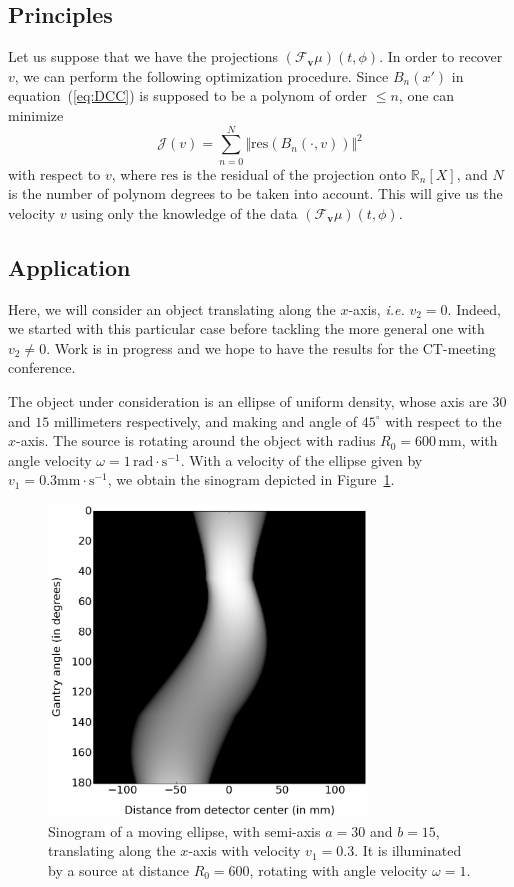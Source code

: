 \documentclass[9pt,technote]{IEEEtran}
\numberwithin{equation}{section}
\newcommand{\R}{\mathbb{R}}
\newcommand{\ie}{\emph{i.e.} }
\newcommand{\Tbv}{\mathcal{F}_{\mathbf{v}}}
\begin{document}
\subsection{Principles}
\label{sub:principles}
Let us suppose that we have the projections $\left( \Tbv \mu \right)(t,\phi)$. In order to recover $v$, we can perform the following optimization procedure. Since $B_n(x')$ in equation~(\ref{eq:DCC}) is supposed to be a polynom of order $\leq n$, one can minimize
\begin{equation}
	\mathcal{J}(v) = \sum_{n=0}^N \Vert \textrm{res} \left( B_n(\cdot,v) \right) \Vert^2
\end{equation}
with respect to $v$, where $\textrm{res}$ is the residual of the projection onto $\R_n[X]$, and $N$ is the number of polynom degrees to be taken into account. This will give us the velocity $v$ using only the knowledge of the data $\left( \Tbv \mu \right)(t,\phi)$.

\subsection{Application}
\label{sub:application}
Here, we will consider an object translating along the $x$-axis, \ie $v_2=0$. Indeed, we started with this particular case before tackling the more general one with $v_2 \neq 0$. Work is in progress and we hope to have the results for the CT-meeting conference. 

The object under consideration is an ellipse of uniform density, whose axis are $30$ and $15$ millimeters respectively, and making and angle of $45^{\circ}$ with respect to the $x$-axis. The source is rotating around the object with radius $R_0 = 600 \, \textrm{mm}$, with angle velocity $\omega = 1 \, \textrm{rad} \cdot \textrm{s}^{-1}$. With a velocity of the ellipse given by $v_1 = 0.3 \textrm{mm} \cdot \textrm{s}^{-1}$, we obtain the sinogram depicted in Figure~\ref{fig:sinogram}.
\begin{figure}[!ht]
	\centering
	\includegraphics[width=85mm]{figs/sinogram.png}
	\caption{Sinogram of a moving ellipse, with semi-axis $a = 30$ and $b = 15$, translating along the $x$-axis with velocity $v_1 = 0.3$. It is illuminated by a source at distance $R_0 = 600$, rotating with angle velocity $\omega = 1$.\label{fig:sinogram}}
\end{figure}
\end{document}
